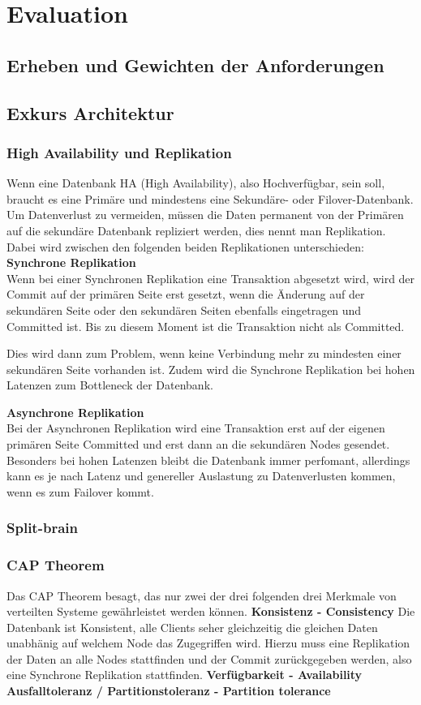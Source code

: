 
\section{Evaluation}
\subsection{Erheben und Gewichten der Anforderungen}
\subsection{Exkurs Architektur}
\subsubsection{High Availability und Replikation}
Wenn eine Datenbank HA (High Availability), also Hochverfügbar, sein soll, braucht es eine Primäre und mindestens eine Sekundäre- oder Filover-Datenbank.
Um Datenverlust zu vermeiden, müssen die Daten permanent von der Primären auf die sekundäre Datenbank repliziert werden, dies nennt man Replikation\cite{D9RDXENY}.
Dabei wird zwischen den folgenden beiden Replikationen unterschieden:
\\\textbf{Synchrone Replikation}\\
Wenn bei einer Synchronen Replikation eine Transaktion abgesetzt wird, wird der Commit auf der primären Seite erst gesetzt, wenn die Änderung auf der sekundären Seite oder den sekundären Seiten ebenfalls eingetragen und Committed ist.
Bis zu diesem Moment ist die Transaktion nicht als Committed.

Dies wird dann zum Problem, wenn keine Verbindung mehr zu mindesten einer sekundären Seite vorhanden ist.
Zudem wird die Synchrone Replikation bei hohen Latenzen zum Bottleneck der Datenbank.

\textbf{Asynchrone Replikation}\\
Bei der Asynchronen Replikation wird eine Transaktion erst auf der eigenen primären Seite Committed und erst dann an die sekundären Nodes gesendet.
Besonders bei hohen Latenzen bleibt die Datenbank immer perfomant, allerdings kann es je nach Latenz und genereller Auslastung zu Datenverlusten kommen, wenn es zum \Gls{Failover} kommt.
\subsubsection{Split-brain}
\subsubsection{CAP Theorem}
Das CAP Theorem besagt, das nur zwei der drei folgenden drei Merkmale von verteilten Systeme gewährleistet werden können\cite{EE6EQHU2}.
\textbf{Konsistenz - Consistency}
Die Datenbank ist Konsistent, alle Clients seher gleichzeitig die gleichen Daten unabhänig auf welchem Node das Zugegriffen wird.
Hierzu muss eine Replikation der Daten an alle Nodes stattfinden und der Commit zurückgegeben werden, also eine Synchrone Replikation stattfinden.
\textbf{Verfügbarkeit - Availability}
\textbf{Ausfalltoleranz / Partitionstoleranz - Partition tolerance}

